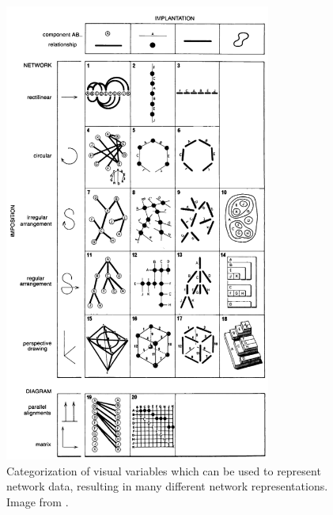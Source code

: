 \begin{figure}
    \centering %
    \includegraphics[width=0.78\textwidth]{static/figures/RelatedWork/BertinNetworks}
    \caption{Categorization of visual variables which can be used to represent network data, resulting in many different network representations. Image from \cite{bertin1967}.}
    \label{fig:bertin-network}
\end{figure}

